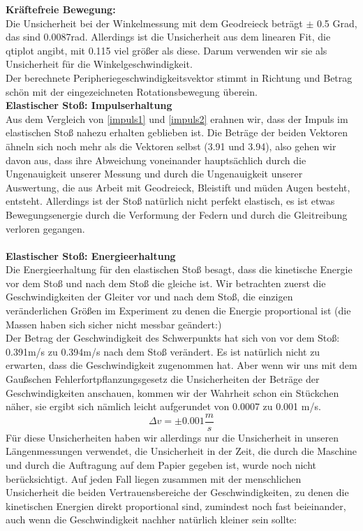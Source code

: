 \documentclass{article}
\begin{document}
\textbf{Kräftefreie Bewegung: } \\
Die Unsicherheit bei der Winkelmessung mit dem Geodreieck beträgt $\pm$ 0.5 Grad, das sind 0.0087rad. Allerdings ist die Unsicherheit aus dem linearen Fit, die qtiplot angibt, mit 0.115 viel größer als diese. Darum verwenden wir sie als Unsicherheit für die Winkelgeschwindigkeit.
\\
Der berechnete Peripheriegeschwindigkeitsvektor stimmt in Richtung und Betrag schön mit der eingezeichneten Rotationsbewegung überein. \\
\textbf{Elastischer Stoß: Impulserhaltung} \\
Aus dem Vergleich von \ref{impuls1} und \ref{impuls2} erahnen wir, dass der Impuls im elastischen Stoß nahezu erhalten geblieben ist. Die Beträge der beiden Vektoren ähneln sich noch mehr als die Vektoren selbst (3.91 und 3.94), also gehen wir davon aus, dass ihre Abweichung voneinander hauptsächlich durch die Ungenauigkeit unserer Messung und durch die Ungenauigkeit unserer Auswertung, die aus Arbeit mit Geodreieck, Bleistift und müden Augen besteht, entsteht. Allerdings ist der Stoß natürlich nicht perfekt elastisch, es ist etwas Bewegungsenergie durch die Verformung der Federn und durch die Gleitreibung verloren gegangen. \\
\\
\textbf{Elastischer Stoß: Energieerhaltung} \\
Die Energieerhaltung für den elastischen Stoß besagt, dass die kinetische Energie vor dem Stoß und nach dem Stoß die gleiche ist. Wir betrachten zuerst die Geschwindigkeiten der Gleiter vor und nach dem Stoß, die einzigen veränderlichen Größen im Experiment zu denen die Energie proportional ist (die Massen haben sich sicher nicht messbar geändert:) \\
Der Betrag der Geschwindigkeit des Schwerpunkts hat sich von vor dem Stoß: 0.391m/s zu 0.394m/s nach dem Stoß verändert. Es ist natürlich nicht zu erwarten, dass die Geschwindigkeit zugenommen hat. Aber wenn wir uns mit dem Gaußschen Fehlerfortpflanzungsgesetz die Unsicherheiten der Beträge der Geschwindigkeiten anschauen, kommen wir der Wahrheit schon ein Stückchen näher, sie ergibt sich nämlich leicht aufgerundet von 0.0007 zu 0.001 m/s.\\
\begin{equation}
\Delta v=\pm 0.001 \frac{m}{s}
\end{equation}
Für diese Unsicherheiten haben wir allerdings nur die Unsicherheit in unseren Längenmessungen verwendet, die Unsicherheit in der Zeit, die durch die Maschine und durch die Auftragung auf dem Papier gegeben ist, wurde noch nicht berücksichtigt. Auf jeden Fall liegen zusammen mit der menschlichen Unsicherheit die beiden Vertrauensbereiche der Geschwindigkeiten, zu denen die kinetischen Energien direkt proportional sind, zumindest noch fast beieinander, auch wenn die Geschwindigkeit nachher natürlich kleiner sein sollte:
\end{document}
